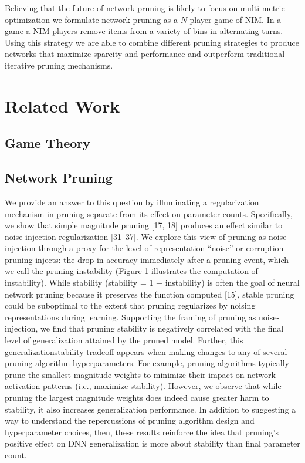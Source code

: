 \documentclass{article}
\begin{document}
Believing that the future of network pruning is likely to focus on multi metric optimization we formulate network pruning as a $N$ player game of NIM. In a game a NIM \cite{BoutonNimA} \cite{Dass2006SecretsBT} players remove items from a variety of bins in alternating turns. Using this strategy we are able to combine different pruning strategies to produce networks that maximize sparcity and performance and outperform traditional iterative pruning mechanisms. 
\section{Related Work}
\subsection{Game Theory}
\subsection{Network Pruning}

We provide an answer to this question by illuminating a regularization mechanism in pruning separate
from its effect on parameter counts. Specifically, we show that simple magnitude pruning [17, 18]
produces an effect similar to noise-injection regularization [31–37]. We explore this view of pruning \cite{Bartoldson2019TheGT}
as noise injection through a proxy for the level of representation “noise” or corruption pruning injects:
the drop in accuracy immediately after a pruning event, which we call the pruning instability (Figure
1 illustrates the computation of instability). While stability (stability = 1 − instability) is often the
goal of neural network pruning because it preserves the function computed [15], stable pruning could
be suboptimal to the extent that pruning regularizes by noising representations during learning.
Supporting the framing of pruning as noise-injection, we find that pruning stability is negatively correlated with the final level of generalization attained by the pruned model. Further, this generalizationstability tradeoff appears when making changes to any of several pruning algorithm hyperparameters.
For example, pruning algorithms typically prune the smallest magnitude weights to minimize their
impact on network activation patterns (i.e., maximize stability). However, we observe that while
pruning the largest magnitude weights does indeed cause greater harm to stability, it also increases
generalization performance. In addition to suggesting a way to understand the repercussions of
pruning algorithm design and hyperparameter choices, then, these results reinforce the idea that
pruning’s positive effect on DNN generalization is more about stability than final parameter count.
\end{document}
